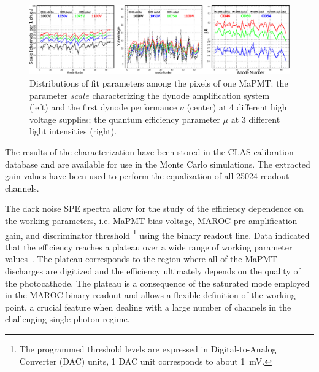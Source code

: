 \documentclass[5p,times,twocolumn]{elsarticle}
\begin{document}
\begin{figure}[h]
	\centering
	\includegraphics[width=\linewidth]{PavelPassport.pdf}
	\caption{Distributions of fit parameters among the pixels of one MaPMT: the parameter $scale$ characterizing
          the dynode amplification system (left) and the first dynode performance $\nu$ (center) at 4 different high
          voltage supplies; the quantum efficiency parameter $\mu$ at 3 different light intensities (right).}
	\label{fig:PavelPassport}
\end{figure}

The results of the characterization have been stored in the CLAS calibration database and are available for use in
the Monte Carlo simulations. The extracted gain values have been used to perform the equalization of all 25024
readout channels.


The dark noise SPE spectra allow for the study of the efficiency dependence on the working parameters, i.e. MaPMT
bias voltage, MAROC pre-amplification gain, and discriminator threshold \footnote{The programmed threshold
levels are expressed in Digital-to-Analog Converter (DAC) units, 1 DAC unit corresponds to about 1~mV.} using the
binary readout line. Data indicated that the efficiency reaches a plateau over a wide range of working parameter
values~\cite{Ref:RICHElectro}. %
The plateau corresponds to the region where all of the MaPMT discharges  are digitized and the efficiency ultimately
depends on the quality of the photocathode. The plateau is a consequence of the saturated mode employed in the
MAROC binary readout and allows a flexible definition of the working point, a crucial feature when dealing with a large
number of channels in the challenging single-photon regime.
\end{document}

